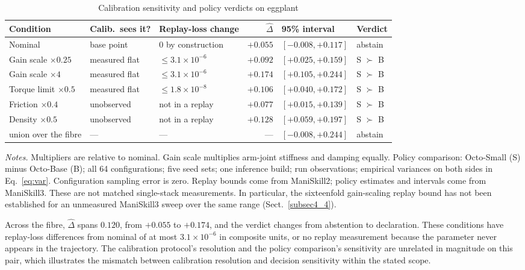 \documentclass[pdflatex,iicol,sn-apa]{sn-jnl}
\theoremstyle{remark}
\newcommand{\tablenote}[1]{\par\vspace{4pt}\noindent
\begin{minipage}{\linewidth}\tablefootnotefont\raggedright #1\par\end{minipage}}
\begin{document}
\begin{table}[t]
\caption{Calibration sensitivity and policy verdicts on eggplant}\label{tab6a}
\small
\begin{tabular}{@{}lllrll@{}}
\toprule
Condition & Calib.\ sees it? & Replay-loss change & $\hat\Delta$ & 95\% interval & Verdict \\
\midrule
Nominal & base point & $0$ by construction & $+0.055$ & $[-0.008, +0.117]$ & abstain \\
Gain scale $\times0.25$ & measured flat & $\le 3.1\times10^{-6}$ & $+0.092$ & $[+0.025, +0.159]$ & S $\succ$ B \\
Gain scale $\times4$ & measured flat & $\le 3.1\times10^{-6}$ & $+0.174$ & $[+0.105, +0.244]$ & S $\succ$ B \\
Torque limit $\times0.5$ & measured flat & $\le 1.8\times10^{-8}$ & $+0.106$ & $[+0.040, +0.172]$ & S $\succ$ B \\
Friction $\times0.4$ & unobserved & not in a replay & $+0.077$ & $[+0.015, +0.139]$ & S $\succ$ B \\
Density $\times0.5$ & unobserved & not in a replay & $+0.128$ & $[+0.059, +0.197]$ & S $\succ$ B \\
\midrule
union over the fibre & --- & --- & --- & $[-0.008, +0.244]$ & abstain \\
\bottomrule
\end{tabular}
\tablenote{\textit{Notes.} Multipliers are relative to nominal. Gain scale multiplies arm-joint stiffness and damping equally. Policy comparison: Octo-Small (S) minus Octo-Base (B); all 64 configurations; five seed sets; one inference build; run observations; empirical variances on both sides in Eq.~\eqref{eq:var}. Configuration sampling error is zero. Replay bounds come from ManiSkill2; policy estimates and intervals come from ManiSkill3. These are not matched single-stack measurements. In particular, the sixteenfold gain-scaling replay bound has not been established for an unmeasured ManiSkill3 sweep over the same range (Sect.~\ref{subsec4_4}).}
\end{table}

Across the fibre, $\hat\Delta$ spans
$0.120$, from $+0.055$ to $+0.174$, and the verdict changes from abstention to declaration.
These conditions have replay-loss differences from nominal of at most $3.1\times10^{-6}$ in composite units,
or no replay measurement because the parameter never appears in the trajectory. The calibration protocol's resolution and the policy
comparison's sensitivity are unrelated in magnitude on this pair, which illustrates the mismatch between calibration resolution and decision sensitivity within
the stated scope.
\end{document}
